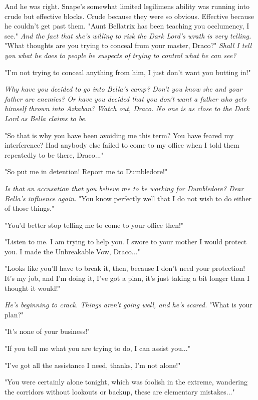 \documentclass[a4paper,11pt]{article}
\begin{document}
And he was right. Snape's somewhat limited legilimens ability was running into crude but effective blocks. Crude because they were so obvious. Effective because he couldn't get past them. "Aunt Bellatrix has been teaching you occlumency, I see." \emph{And the fact that she's willing to risk the Dark Lord's wrath is very telling.} "What thoughts are you trying to conceal from your master, Draco?" \emph{Shall I tell you what he does to people he suspects of trying to control what he can see?}

"I'm not trying to conceal anything from him, I just don't want you butting in!"

\emph{Why have you decided to go into Bella's camp? Don't you know she and your father are enemies? Or have you decided that you don't want a father who gets himself thrown into Azkaban? Watch out, Draco. No one is as close to the Dark Lord as Bella claims to be.}

"So that is why you have been avoiding me this term? You have feared my interference? Had anybody else failed to come to my office when I told them repeatedly to be there, Draco..."

"So put me in detention! Report me to Dumbledore!"

\emph{Is that an accusation that you believe me to be working for Dumbledore? Dear Bella's influence again.} "You know perfectly well that I do not wish to do either of those things."

"You'd better stop telling me to come to your office then!"

"Listen to me. I am trying to help you. I swore to your mother I would protect you. I made the Unbreakable Vow, Draco..."

"Looks like you'll have to break it, then, because I don't need your protection! It's my job, and I'm doing it, I've got a plan, it's just taking a bit longer than I thought it would!"

\emph{He's beginning to crack. Things aren't going well, and he's scared.} "What is your plan?"

"It's none of your business!"

"If you tell me what you are trying to do, I can assist you..."

"I've got all the assistance I need, thanks, I'm not alone!"

"You were certainly alone tonight, which was foolish in the extreme, wandering the corridors without lookouts or backup, these are elementary mistakes..."
\end{document}
